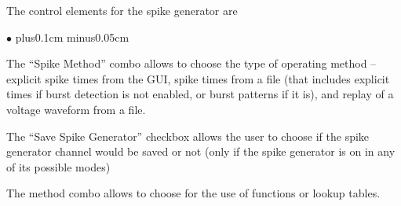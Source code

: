 \documentclass{article}
\newenvironment{myitem}{\begin{list}{$\bullet$}{\setlength{\leftmargin}{1.1em}
\itemsep0.1cm plus0.1cm minus0.05cm
\listparindent0cm
\addtolength{\labelsep}{0.5\labelsep}
\setlength{\labelwidth}{0.8em}
\setlength{\leftmargin}{\labelwidth}
\addtolength{\leftmargin}{\labelsep}
}}{\end{list}}
\begin{document}
The control elements for the spike generator are
\begin{myitem}
\item The ``Spike Method'' combo allows to choose the type of operating
  method -- explicit spike times from the GUI, spike times from a file
  (that includes explicit times if burst detection is not enabled, or
  burst patterns if it is), and replay of a voltage waveform from a
  file.
\item The ``Save Spike Generator'' checkbox allows the user to choose if
  the spike generator channel would be saved or not (only if the spike
  generator is on in any of its possible modes)
\item The method combo allows to choose for the use of functions or
  lookup tables.
\end{myitem}
\end{document}
